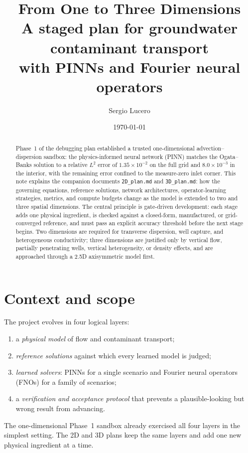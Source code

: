 \documentclass[11pt]{article}
\title{From One to Three Dimensions\\[2pt]
\large A staged plan for groundwater contaminant transport\\
with PINNs and Fourier neural operators}
\author{Sergio Lucero}
\date{\today}
\begin{document}
\maketitle

\begin{abstract}
Phase~1 of the debugging plan established a trusted one-dimensional
advection--dispersion sandbox: the physics-informed neural network (PINN)
matches the Ogata--Banks solution to a relative $L^{2}$ error of
$1.35\times10^{-2}$ on the full grid and $8.0\times10^{-3}$ in the interior,
with the remaining error confined to the measure-zero inlet corner.  This note
explains the companion documents \texttt{2D\_plan.md} and
\texttt{3D\_plan.md}: how the governing equations, reference solutions,
network architectures, operator-learning strategies, metrics, and compute
budgets change as the model is extended to two and three spatial dimensions.
The central principle is gate-driven development: each stage adds one physical
ingredient, is checked against a closed-form, manufactured, or
grid-converged reference, and must pass an explicit accuracy threshold before
the next stage begins.  Two dimensions are required for transverse dispersion,
well capture, and heterogeneous conductivity; three dimensions are justified
only by vertical flow, partially penetrating wells, vertical heterogeneity, or
density effects, and are approached through a 2.5D axisymmetric model first.
\end{abstract}

\tableofcontents

\section{Context and scope}
\label{sec:context}

The project evolves in four logical layers:
\begin{enumerate}[leftmargin=1.6em,itemsep=2pt]
  \item a \emph{physical model} of flow and contaminant transport;
  \item \emph{reference solutions} against which every learned model is judged;
  \item \emph{learned solvers}: PINNs for a single scenario and Fourier neural
        operators (FNOs) for a family of scenarios;
  \item a \emph{verification and acceptance protocol} that prevents a
        plausible-looking but wrong result from advancing.
\end{enumerate}
The one-dimensional Phase~1 sandbox already exercised all four layers in the
simplest setting.  The 2D and 3D plans keep the same layers and add one new
physical ingredient at a time.
\end{document}

